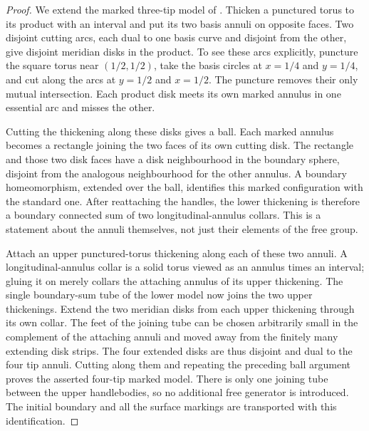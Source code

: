 \begin{proof}
We extend the marked three-tip model of
\cite[Lemma~2.3]{MT}.  Thicken a punctured torus to its product with
an interval and put its two basis annuli on opposite faces.  Two
disjoint cutting arcs, each dual to one basis curve and disjoint from
the other, give disjoint meridian disks in the product.  To see these
arcs explicitly, puncture the square torus near $(1/2,1/2)$, take
the basis circles at $x=1/4$ and $y=1/4$, and cut along the arcs
at $y=1/2$ and $x=1/2$.  The puncture removes their only mutual
intersection.  Each product disk meets its own marked annulus in
one essential arc and misses the other.

Cutting the thickening along these disks gives a ball.  Each marked
annulus becomes a rectangle joining the two faces of its own cutting
disk.  The rectangle and those two disk faces have a disk neighbourhood
in the boundary sphere, disjoint from the analogous neighbourhood for
the other annulus.  A boundary homeomorphism, extended over the ball,
identifies this marked configuration with the standard one.  After
reattaching the handles, the lower thickening is therefore a boundary
connected sum of two longitudinal-annulus collars.  This is a statement
about the annuli themselves, not just their elements of the free group.

Attach an upper punctured-torus thickening along each of these two
annuli.  A longitudinal-annulus collar is a solid torus viewed as an
annulus times an interval; gluing it on merely collars the attaching
annulus of its upper thickening.  The single boundary-sum tube of the
lower model now joins the two upper thickenings.  Extend the two
meridian disks from each upper thickening through its own collar.
The feet of the joining tube can be chosen arbitrarily small in the
complement of the attaching annuli and moved away from the finitely
many extending disk strips.  The four extended disks are thus disjoint
and dual to the four tip annuli.  Cutting along them and repeating the
preceding ball argument proves the asserted four-tip marked model.
There is only one joining tube between the upper handlebodies, so no
additional free generator is introduced.  The initial boundary and
all the surface markings are transported with this identification.


\end{proof}
